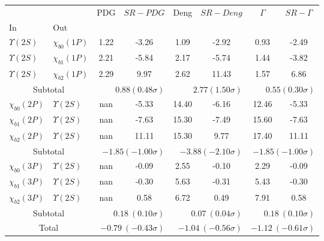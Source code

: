 \begin{tabular}{|l|l|c|c|c|c|c|c|}%
\hline%
&&PDG&$SR-PDG$&Deng&$SR-Deng$&$\Gamma$&$SR-\Gamma$\\%
In&Out&&&&&&\\%
\hline%
$\Upsilon(2S)$&$\chi_{b0}(1P)$&1.22&-3.26&1.09&-2.92&0.93&-2.49\\%
$\Upsilon(2S)$&$\chi_{b1}(1P)$&2.21&-5.84&2.17&-5.74&1.44&-3.82\\%
$\Upsilon(2S)$&$\chi_{b2}(1P)$&2.29&9.97&2.62&11.43&1.57&6.86\\%
\hline%
\hline%
\multicolumn{2}{|c|}{Subtotal}&\multicolumn{2}{|r|}{$0.88 (0.48\sigma)$}&\multicolumn{2}{|r|}{$2.77 (1.50\sigma)$}&\multicolumn{2}{|r|}{$0.55 (0.30\sigma)$}\\%
\hline%
\hline%
$\chi_{b0}(2P)$&$\Upsilon(2S)$&nan&-5.33&14.40&-6.16&12.46&-5.33\\%
$\chi_{b1}(2P)$&$\Upsilon(2S)$&nan&-7.63&15.30&-7.49&15.60&-7.63\\%
$\chi_{b2}(2P)$&$\Upsilon(2S)$&nan&11.11&15.30&9.77&17.40&11.11\\%
\hline%
\hline%
\multicolumn{2}{|c|}{Subtotal}&\multicolumn{2}{|r|}{$-1.85 (-1.00\sigma)$}&\multicolumn{2}{|r|}{$-3.88 (-2.10\sigma)$}&\multicolumn{2}{|r|}{$-1.85 (-1.00\sigma)$}\\%
\hline%
\hline%
$\chi_{b0}(3P)$&$\Upsilon(2S)$&nan&-0.09&2.55&-0.10&2.29&-0.09\\%
$\chi_{b1}(3P)$&$\Upsilon(2S)$&nan&-0.30&5.63&-0.31&5.43&-0.30\\%
$\chi_{b2}(3P)$&$\Upsilon(2S)$&nan&0.58&6.72&0.49&7.91&0.58\\%
\hline%
\hline%
\multicolumn{2}{|c|}{Subtotal}&\multicolumn{2}{|r|}{$0.18~(0.10\sigma)$}&\multicolumn{2}{|r|}{$0.07~(0.04\sigma)$}&\multicolumn{2}{|r|}{$0.18~(0.10\sigma)$}\\%
\hline%
\hline%
\multicolumn{2}{|c|}{Total}&\multicolumn{2}{|r|}{$-0.79~(-0.43\sigma)$}&\multicolumn{2}{|r|}{$-1.04~(-0.56\sigma)$}&\multicolumn{2}{|r|}{$-1.12~(-0.61\sigma)$}\\%
\hline%
\end{tabular}